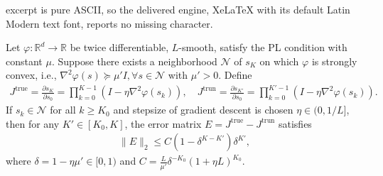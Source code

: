 \documentclass[10pt,a4paper]{amsart}
\def\R{\mathbb{R}}
\def\cN{\mathcal{N}} \def\cO{\mathcal{O}} \def\cP{\mathcal{P}}
\begin{document}
excerpt is pure ASCII, so the delivered engine, XeLaTeX with its default Latin Modern text font, reports no missing character.
\begin{lemma}\label{lemma: general Jac error}
    Let $\varphi: \R^d \rightarrow \R$ be twice differentiable, $L$-smooth, satisfy the PL condition with constant $\mu$. Suppose there exists a neighborhood $\cN$ of $s_K$ on which $\varphi$ is strongly convex, i.e., $\nabla^2 \varphi(s) \succeq \mu' I, \forall s \in \cN$ with $\mu' > 0$. Define 
    \begin{align*}
        J^\mathrm{true} = \frac{\partial s_K}{ \partial s_0} = \prod_{k=0}^{K-1} (I - \eta \nabla^2 \varphi (s_k)),
        \quad 
        J^\mathrm{trun} = \frac{\partial s_{K'}}{ \partial s_0} = \prod_{k=0}^{K'-1} (I - \eta \nabla^2 \varphi (s_k)).
    \end{align*}
    If $s_k \in \cN$ for all $k \geq K_0$ and stepsize of gradient descent is chosen $\eta \in (0, {1}/{L}]$, then for any $K' \in [K_0, K]$, the error matrix $E = J^\mathrm{true} - J^\mathrm{trun}$ satisfies
    \begin{align*}
        \| E \|_2 \leq C ( 1 - \delta^{K-K'}) \delta^{K'},
    \end{align*}
    where $\delta = 1 - \eta \mu' \in [0, 1)$ and $C = \frac{L}{\mu'} \delta^{-K_0}(1 + \eta L)^{K_0}$.
\end{lemma}
\end{document}
